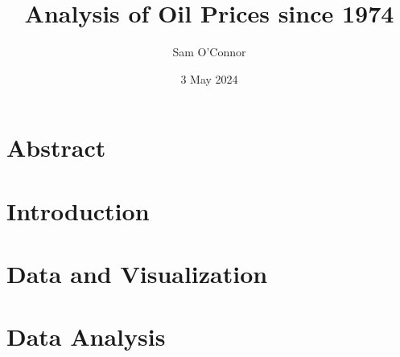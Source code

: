 \documentclass{article}
\author{Sam O'Connor}
\title{Analysis of Oil Prices since 1974}
\date{3 May 2024}
\begin{document}
\maketitle

\section{Abstract}


\section{Introduction}


\section{Data and Visualization}


\section{Data Analysis}




\end{document}
